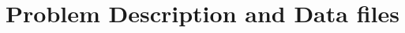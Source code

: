 \documentclass[../../main.tex]{subfiles}
\begin{document}
\chapter{Problem Description and Data files}


\clearpage 

\clearpage
\end{document}
